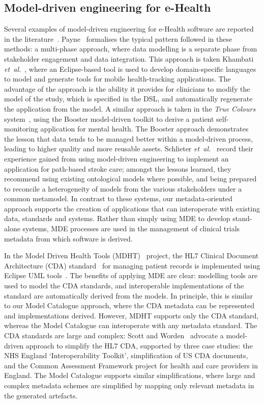 \subsection{Model-driven engineering for e-Health}

Several examples of model-driven engineering for e-Health software are
reported in the literature~\cite{dav14,ragh08,blob07,kham08,schl15}.
Payne~\cite{pay12} formalises the typical pattern followed in these
methods: a multi-phase approach, where data modelling is a separate
phase from stakeholder engagement and data integration. This approach
is taken Khambati \textit{et~al.}~\cite{kham08}, where an
Eclipse-based tool is used to develop domain-specific languages to
model and generate tools for mobile health-tracking applications. The
advantage of the approach is the ability it provides for clinicians to
modify the model of the study, which is specified in the DSL, and
automatically regenerate the application from the model. A similar
approach is taken in the \emph{True Colours} system~\cite{dav14},
using the Booster model-driven toolkit to derive a patient
self-monitoring application for mental health. The Booster approach
demonstrates the lesson that data tends to be managed better within a
model-driven process, leading to higher quality and more reusable
assets.  Schlieter \textit{et~al.}~\cite{schl15} record their
experience gained from using model-driven engineering to implement an
application for path-based stroke care; amongst the lessons learned,
they recommend using existing ontological models where possible, and
being prepared to reconcile a heterogeneity of models from the various
stakeholders under a common metamodel.  In contrast to these systems,
our metadata-oriented approach supports the creation of applications
that can interoperate with existing data, standards and
systems. Rather than simply using MDE to develop stand-alone systems,
MDE processes are used in the management of clinical trials metadata
from which software is derived.

In the Model Driven Health Tools (MDHT)~\cite{MDHT} project, the HL7
Clinical Document Architecture (CDA) standard~\cite{doli06} for
managing patient records is implemented using Eclipse UML
tools~\cite{EUML}. The benefits of applying MDE
are clear: modelling tools are used to model the CDA standards, and
interoperable implementations of the standard are automatically
derived from the models. In principle, this is similar to 
our Model Catalogue approach, where the CDA metadata can be represented and
implementations derived. However, MDHT supports only the CDA standard,
whereas the Model Catalogue can interoperate with any metadata
standard. The CDA standards are large and complex: 
Scott and Worden~\cite{sco12} advocate a
model-driven approach to simplify the HL7 CDA,
supported by three case studies: the NHS England `Interoperability
Toolkit', simplification of US CDA documents, and the Common
Assessment Framework project for health and care providers in
England. The Model Catalogue supports
similar simplifications, where large and complex metadata schemes are
simplified by mapping only relevant metadata in the generated
artefacts.

